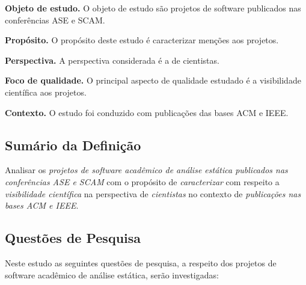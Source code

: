 \begin{description}
\item{\bf Objeto de estudo.} 
O objeto de estudo são projetos de software publicados nas conferências ASE e SCAM.

\item{\bf Propósito.} 
O propósito deste estudo é caracterizar menções aos projetos.

\item{\bf Perspectiva.} 
A perspectiva considerada é a de cientistas.

\item{\bf Foco de qualidade.} 
O principal aspecto de qualidade estudado é a visibilidade científica aos projetos.

\item{\bf Contexto.} 
O estudo foi conduzido com publicações das bases ACM e IEEE.
\end{description}

\subsection{Sumário da Definição}

Analisar os \textit{projetos de software acadêmico de análise estática publicados nas conferências ASE e SCAM}
com o propósito de \textit{caracterizar}
com respeito a \textit{visibilidade científica}
na perspectiva de \textit{cientistas}
no contexto de \textit{publicações nas bases ACM e IEEE}.

\subsection{Questões de Pesquisa}

Neste estudo as seguintes questões de pesquisa, a respeito dos projetos de
software acadêmico de análise estática, serão investigadas:

\newcommand{\EstudoDoisQuestaoUm}{Como os projetos de software acadêmico de
análise estática publicados nas conferências ASE e SCAM são mencionados em
publicações nas bases ACM e IEEE?}

\newcommand{\EstudoDoisQuestaoDois}{Os projetos de software acadêmico de
análise estática publicados nas conferências ASE e SCAM são utilizados
em publicações nas bases ACM e IEEE?}

\newcommand{\EstudoDoisQuestaoTres}{Os projetos de software acadêmico de
análise estática publicados nas conferências ASE e SCAM recebem contribuições
de código fonte em publicações nas bases ACM e IEEE?}

